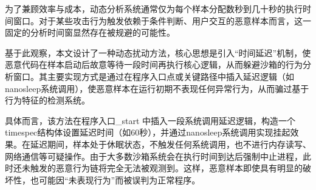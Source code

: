 为了兼顾效率与成本，动态分析系统通常仅为每个样本分配数秒到几十秒的执行时间窗口。对于某些攻击行为触发依赖于条件判断、用户交互的恶意样本而言，这一固定的分析时间窗显然存在被规避的可能性。


基于此观察，本文设计了一种动态扰动方法，核心思想是引入“时间延迟”机制，使恶意代码在样本启动后故意等待一段时间再执行核心逻辑，从而躲避沙箱的行为分析窗口。其主要实现方式是通过在程序入口点或关键路径中插入延迟逻辑（如 nanosleep系统调用），使恶意样本在运行初期不表现任何异常行为，从而骗过基于行为特征的检测系统。


具体而言，该方法在程序入口\_start 中插入一段系统调用延迟逻辑，构造一个 timespec结构体设置延迟时间（如60秒），并通过nanosleep系统调用实现挂起效果。在延迟期间，样本处于休眠状态，不触发任何系统调用，也不进行内存读写、网络通信等可疑操作。由于大多数沙箱系统会在执行时间到达后强制中止进程，此时还未触发的恶意行为链将完全无法被观测到。这样，恶意样本即使具有明显的破坏性，也可能因“未表现行为”而被误判为正常程序。


